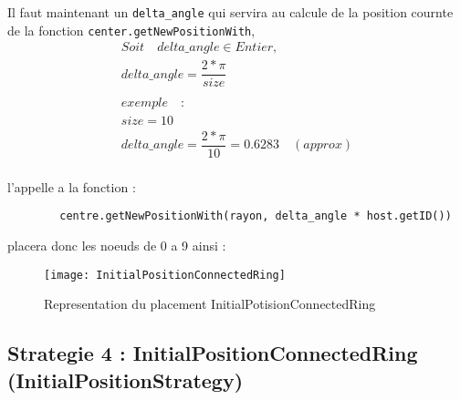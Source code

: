 \documentclass[11pt,a4paper,sans]{report}
\begin{document}
	Il faut maintenant un \texttt{delta\_angle} qui servira au calcule de la position cournte de la fonction \texttt{center.getNewPositionWith},
	\begin{gather}
		Soit \quad delta\_angle \in Entier, \\
		delta\_angle = \dfrac{2 * \pi}{size} \\ 
		\\
		exemple \quad : \\ 
		size = 10 \\
		delta\_angle = \dfrac{2 * \pi}{10} = 0.6283 \quad(approx)\\ 
	\end{gather}

	\par l'appelle a la fonction  :
	\begin{lstlisting}
		centre.getNewPositionWith(rayon, delta_angle * host.getID())
	\end{lstlisting}
	\par placera donc les noeuds de 0 a 9 ainsi :
	\begin{figure}[h]
		\centering
		\texttt{[image: InitialPositionConnectedRing]}
		\caption{Representation du placement InitialPotisionConnectedRing}
	\end{figure}



	\subsection*{Strategie 4 : InitialPositionConnectedRing (InitialPositionStrategy)}
\end{document}
